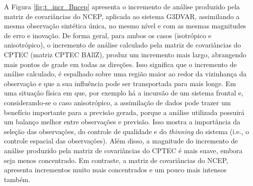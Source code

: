 A Figura \ref{fig:t_incr_Bncep} apresenta o incremento de análise produzido pela matriz de covariâncias do NCEP, aplicada ao sistema G3DVAR, assimilando a mesma observação sintética única, no mesmo nível e com as mesmas magnitudes de erro e inovação. De forma geral, para ambos os casos (isotrópico e anisotrópico), o incremento de análise calculado pela matriz de covariâncias do CPTEC (matriz CPTEC BAllZ), produz um incremento mais largo, abrangendo mais pontos de grade em todas as direções. Isso significa que o incremento de análise calculado, é espalhado sobre uma região maior ao redor da vizinhança da observação e que a sua influência pode ser transportada para mais longe. Em uma situação física em que, por exemplo há a incursão de um sistema frontal e, considerando-se o caso anisotrópico, a assimilação de dados pode trazer um benefício importante para a previsão gerada, porque a análise utilizada possuirá um balanço melhor entre observações e previsão. Isso mostra a importância da seleção das observações, do controle de qualidade e do \textit{thinning} do sistema (i.e., o controle espacial das observações). Além disso, a magnitude do incremento de análise produzido pela matriz de covariâncias do CPTEC é mais suave, embora seja menos concentrado. Em contraste, a matriz de covariâncias do NCEP, apresenta incrementos muito mais concentrados e um pouco mais intensos também.    
    
